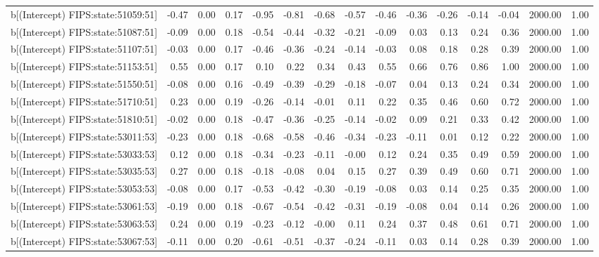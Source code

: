 \begin{table}[ht]
\begin{tabular}{rrrrrrrrrrrrrrr}
  b[(Intercept) FIPS:state:51059:51] & -0.47 & 0.00 & 0.17 & -0.95 & -0.81 & -0.68 & -0.57 & -0.46 & -0.36 & -0.26 & -0.14 & -0.04 & 2000.00 & 1.00 \\ 
  b[(Intercept) FIPS:state:51087:51] & -0.09 & 0.00 & 0.18 & -0.54 & -0.44 & -0.32 & -0.21 & -0.09 & 0.03 & 0.13 & 0.24 & 0.36 & 2000.00 & 1.00 \\ 
  b[(Intercept) FIPS:state:51107:51] & -0.03 & 0.00 & 0.17 & -0.46 & -0.36 & -0.24 & -0.14 & -0.03 & 0.08 & 0.18 & 0.28 & 0.39 & 2000.00 & 1.00 \\ 
  b[(Intercept) FIPS:state:51153:51] & 0.55 & 0.00 & 0.17 & 0.10 & 0.22 & 0.34 & 0.43 & 0.55 & 0.66 & 0.76 & 0.86 & 1.00 & 2000.00 & 1.00 \\ 
  b[(Intercept) FIPS:state:51550:51] & -0.08 & 0.00 & 0.16 & -0.49 & -0.39 & -0.29 & -0.18 & -0.07 & 0.04 & 0.13 & 0.24 & 0.34 & 2000.00 & 1.00 \\ 
  b[(Intercept) FIPS:state:51710:51] & 0.23 & 0.00 & 0.19 & -0.26 & -0.14 & -0.01 & 0.11 & 0.22 & 0.35 & 0.46 & 0.60 & 0.72 & 2000.00 & 1.00 \\ 
  b[(Intercept) FIPS:state:51810:51] & -0.02 & 0.00 & 0.18 & -0.47 & -0.36 & -0.25 & -0.14 & -0.02 & 0.09 & 0.21 & 0.33 & 0.42 & 2000.00 & 1.00 \\ 
  b[(Intercept) FIPS:state:53011:53] & -0.23 & 0.00 & 0.18 & -0.68 & -0.58 & -0.46 & -0.34 & -0.23 & -0.11 & 0.01 & 0.12 & 0.22 & 2000.00 & 1.00 \\ 
  b[(Intercept) FIPS:state:53033:53] & 0.12 & 0.00 & 0.18 & -0.34 & -0.23 & -0.11 & -0.00 & 0.12 & 0.24 & 0.35 & 0.49 & 0.59 & 2000.00 & 1.00 \\ 
  b[(Intercept) FIPS:state:53035:53] & 0.27 & 0.00 & 0.18 & -0.18 & -0.08 & 0.04 & 0.15 & 0.27 & 0.39 & 0.49 & 0.60 & 0.71 & 2000.00 & 1.00 \\ 
  b[(Intercept) FIPS:state:53053:53] & -0.08 & 0.00 & 0.17 & -0.53 & -0.42 & -0.30 & -0.19 & -0.08 & 0.03 & 0.14 & 0.25 & 0.35 & 2000.00 & 1.00 \\ 
  b[(Intercept) FIPS:state:53061:53] & -0.19 & 0.00 & 0.18 & -0.67 & -0.54 & -0.42 & -0.31 & -0.19 & -0.08 & 0.04 & 0.14 & 0.26 & 2000.00 & 1.00 \\ 
  b[(Intercept) FIPS:state:53063:53] & 0.24 & 0.00 & 0.19 & -0.23 & -0.12 & -0.00 & 0.11 & 0.24 & 0.37 & 0.48 & 0.61 & 0.71 & 2000.00 & 1.00 \\ 
  b[(Intercept) FIPS:state:53067:53] & -0.11 & 0.00 & 0.20 & -0.61 & -0.51 & -0.37 & -0.24 & -0.11 & 0.03 & 0.14 & 0.28 & 0.39 & 2000.00 & 1.00 \\ 

\end{tabular}
\end{table}
